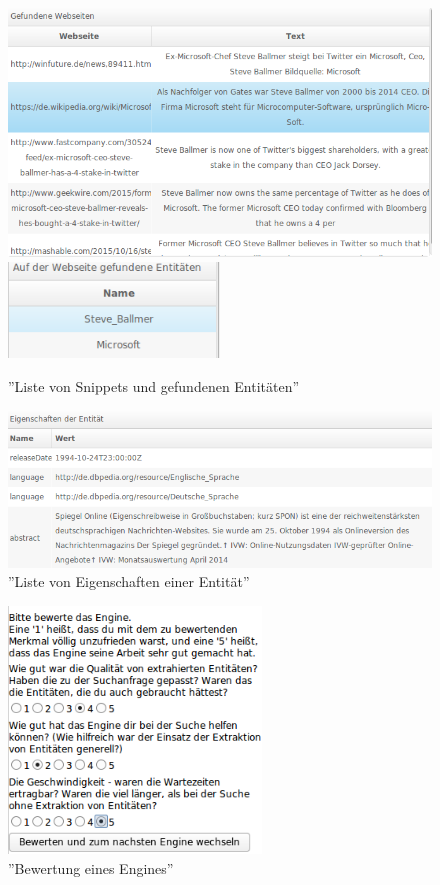 \begin{figure}
\centering
\includegraphics[width=1\textwidth]{Bilder/evalstep02-step1.png}
\includegraphics[width=0.5\textwidth]{Bilder/evalstep02-step1-2.png}
\caption{''Liste von Snippets und gefundenen Entitäten''}
\label{fig:eval-entitylist}
\end{figure}

\begin{figure}
\centering
\includegraphics[width=1\textwidth]{Bilder/eval-step03.png}
\caption{''Liste von Eigenschaften einer Entität''}
\label{fig:eval-props}
\end{figure}

\begin{figure}
\centering
\includegraphics[width=0.6\textwidth]{Bilder/bewertung-eval.png}
\caption{''Bewertung eines Engines''}
\label{fig:bewertung}
\end{figure}

